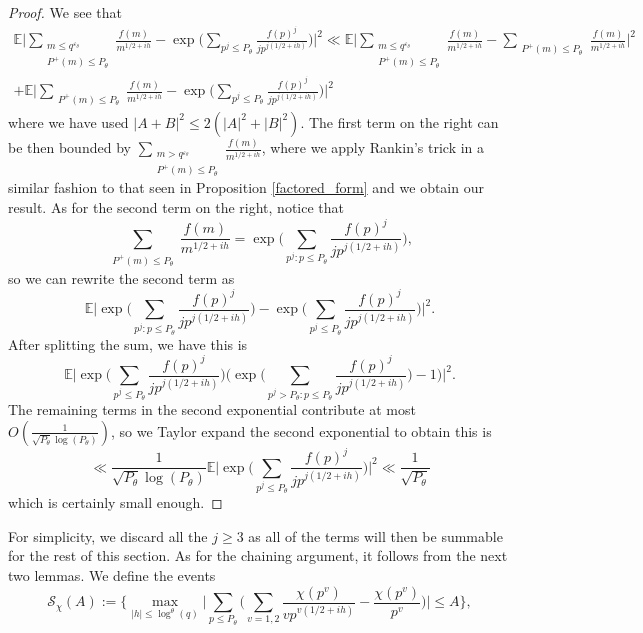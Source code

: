 \documentclass[10pt,a4paper]{amsart}
\numberwithin{equation}{section}
\begin{document}
\begin{proof}
    We see that
    \begin{equation*}
        \begin{split}\mathbb{E}\big|\sum_{\substack{m \leq q^{\varepsilon_\theta} \\ P^+(m) \leq P_\theta}}\frac{f(m)}{m^{1/2+ih}} - \exp\big(\sum_{p^j \leq P_\theta}\frac{f(p)^j}{jp^{j(1/2+ih)}}\big)\big|^2 \ll \mathbb{E}\big|\sum_{\substack{m \leq q^{\varepsilon_\theta} \\ P^+(m) \leq P_\theta}}\frac{f(m)}{m^{1/2+ih}}-\sum_{\substack{P^+(m) \leq P_\theta}}\frac{f(m)}{m^{1/2+ih}}\big|^2 \\ +\mathbb{E}\big|\sum_{\substack{P^+(m) \leq P_\theta}}\frac{f(m)}{m^{1/2+ih}}-\exp\big(\sum_{p^j \leq P_\theta}\frac{f(p)^j}{jp^{j(1/2+ih)}}\big)\big|^2\end{split}
    \end{equation*}
    where we have used $|A+B|^2 \leq 2(|A|^2+|B|^2)$. The first term on the right can be then bounded by $\sum_{\substack{m > q^{\varepsilon_\theta} \\ P^+(m) \leq P_\theta}}\frac{f(m)}{m^{1/2+ih}}$, where we apply Rankin's trick in a similar fashion to that seen in Proposition \ref{factored_form} and we obtain our result. As for the second term on the right, notice that
    $$\sum_{\substack{P^+(m) \leq P_\theta}}\frac{f(m)}{m^{1/2+ih}} = \exp\bigg(\sum_{p^j :p \leq P_\theta}\frac{f(p)^j}{jp^{j(1/2+ih)}}\bigg),$$
    so we can rewrite the second term as
    $$\mathbb{E}\big|\exp\big(\sum_{p^j :p \leq P_\theta}\frac{f(p)^j}{jp^{j(1/2+ih)}}\big)-\exp\big(\sum_{p^j \leq P_\theta}\frac{f(p)^j}{jp^{j(1/2+ih)}}\big)\big|^2.$$
    After splitting the sum, we have this is
    $$\mathbb{E}\big|\exp\big(\sum_{p^j \leq P_\theta}\frac{f(p)^j}{jp^{j(1/2+ih)}}\big)\big(\exp\big(\sum_{p^j >P_\theta:p \leq P_\theta}\frac{f(p)^j}{jp^{j(1/2+ih)}}\big)-1\big)\big|^2.$$
    The remaining terms in the second exponential contribute at most $O(\frac{1}{\sqrt{P_\theta}\log(P_\theta)})$, so we Taylor expand the second exponential to obtain this is
    $$\ll \frac{1}{\sqrt{P_\theta}\log(P_\theta)}\mathbb{E}\big|\exp\big(\sum_{p^j \leq P_\theta}\frac{f(p)^j}{jp^{j(1/2+ih)}}\big)\big|^2 \ll \frac{1}{\sqrt{P_\theta}}$$
    which is certainly small enough.
\end{proof}
For simplicity, we discard all the $j \geq 3$ as all of the terms will then be summable for the rest of this section. As for the chaining argument, it follows from the next two lemmas. We define the events
\begin{equation}
    \mathcal{S}_\chi(A) :=\big\{\max_{|h| \leq \log^{\theta}(q)}\big|\sum_{p \leq P_\theta}\bigg(\sum_{v=1,2}\frac{\chi(p^v)}{vp^{v(1/2+ih)}}-\frac{\chi(p^v)}{p^{v}}\bigg) \big| \leq A\big\}, \label{central_char_shift}
\end{equation}
\end{document}
